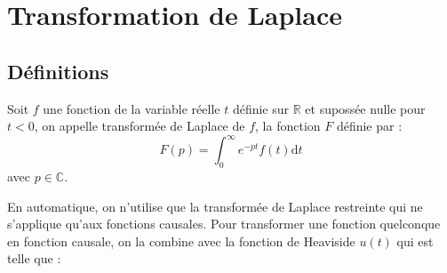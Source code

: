 \chapter{Transformation de Laplace\label{annexe-lap}}
\section{Définitions} 
Soit $f$ une fonction de la variable réelle $t$ définie sur $\mathbb{R}$ 
et supossée  nulle pour $t<0$, on appelle transformée de Laplace de $f$, 
la fonction $F$ définie par :
$$
F(p) = \int_0^\infty e^{-pt} f(t) \mathrm{d}t
$$
avec $p\in\mathbb{C}$. 

En automatique, on n'utilise que la transformée de Laplace restreinte qui 
ne s'applique qu'aux fonctions causales.
Pour transformer une fonction quelconque en fonction causale, 
on la combine avec la fonction de Heaviside $u(t)$ qui est telle que :

{\tikzset{external/export=false}
\begin{center}
\end{center}
}

